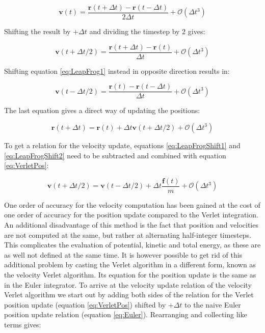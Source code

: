\documentclass[english, a4paper, 12pt, titlepage, draft]{article}
\newcommand{\vect}[1]{\mathbf{#1}}
\newcommand{\vfun}[2]{\vect{#1}\left(#2\right)}
\begin{document}
\begin{equation}
    \vfun{v}{t} = \frac{\vfun{r}{t+\Delta t} - \vfun{r}{t-\Delta t}}{2 \Delta t} + \mathcal{O}(\Delta t^3)
    \label{eq:LeapFrog1}
\end{equation}

Shifting the result by $+\Delta t$ and dividing the timestep by $2$ gives:

\begin{equation}
    \vfun{v}{t + \Delta t/2} = \frac{\vfun{r}{t+\Delta t} - \vfun{r}{t}}{\Delta t} + \mathcal{O}(\Delta t^3)
    \label{eq:LeapFrogShift1}
\end{equation}

Shifting equation \ref{eq:LeapFrog1} instead in opposite direction results in:

\begin{equation}
    \vfun{v}{t - \Delta t/2} = \frac{\vfun{r}{t} - \vfun{r}{t-\Delta t}}{\Delta t} + \mathcal{O}(\Delta t^3)
    \label{eq:LeapFrogShift2}
\end{equation} 

The last equation gives a direct way of updating the positions:

\begin{equation}
    \vfun{r}{t+\Delta t} = \vfun{r}{t} + \Delta t \vfun{v}{t+\Delta t/2} + \mathcal{O}(\Delta t^3)
\end{equation}

To get a relation for the velocity update, equations \ref{eq:LeapFrogShift1} and \ref{eq:LeapFrogShift2} need to be subtracted and combined with equation \ref{eq:VerletPos}:

\begin{equation}
    \vfun{v}{t+\Delta t/2} = \vfun{v}{t-\Delta t/2} + \Delta t \frac{\vfun{f}{t}}{m} + \mathcal{O}(\Delta t^3)
\end{equation}

One order of accuracy for the velocity computation has been gained at the cost of one order of accuracy for the position update compared to the Verlet integration.
An additional disadvantage of this method is the fact that position and velocities are not computed at the same, but rather at alternating half-integer timesteps.
This complicates the evaluation of potential, kinetic and total energy, as these are as well not defined at the same time.
It is however possible to get rid of this additional problem by casting the Verlet algorithm in a different form, known as the velocity Verlet algorithm.
Its equation for the position update is the same as in the Euler integrator.
To arrive at the velocity update relation of the velocity Verlet algorithm we start out by adding both sides of the relation for the Verlet position update (equation \ref{eq:VerletPos}) shifted by $+\Delta t$ to the naive Euler position update relation (equation \ref{eq:Euler}).
Rearranging and collecting like terms gives:
\end{document}

